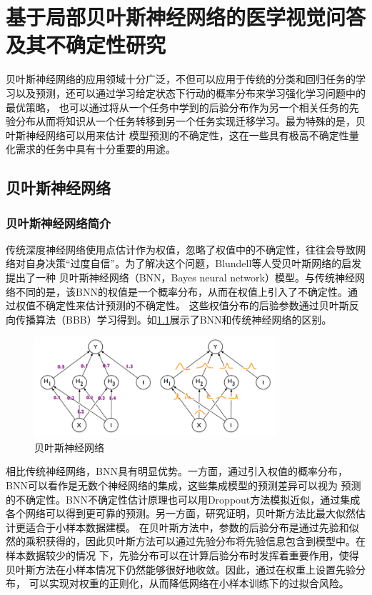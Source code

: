 \chapter{基于局部贝叶斯神经网络的医学视觉问答及其不确定性研究}
贝叶斯神经网络的应用领域十分广泛，不但可以应用于传统的分类和回归任务的学习以及预测，还可以通过学习给定状态下行动的概率分布来学习强化学习问题中的最优策略，
也可以通过将从一个任务中学到的后验分布作为另一个相关任务的先验分布从而将知识从一个任务转移到另一个任务实现迁移学习。最为特殊的是，贝叶斯神经网络可以用来估计
模型预测的不确定性，这在一些具有极高不确定性量化需求的任务中具有十分重要的用途。
%
\section{贝叶斯神经网络}
\subsection{贝叶斯神经网络简介}
传统深度神经网络使用点估计作为权值，忽略了权值中的不确定性，往往会导致网络对自身决策“过度自信”\cite{shridhar2019comprehensive}。为了解决这个问题，Blundell等人\cite{blundell2015weight}受贝叶斯网络的启发提出了一种
贝叶斯神经网络（BNN，Bayes neural network）模型。与传统神经网络不同的是，该BNN的权值是一个概率分布，从而在权值上引入了不确定性。通过权值不确定性来估计预测的不确定性。
这些权值分布的后验参数通过贝叶斯反向传播算法（BBB）学习得到。如\ref{BNN}展示了BNN和传统神经网络的区别。
\begin{figure}[htbp]
	\centering	
	\includegraphics[width=0.8\textwidth]{Fig/myfig/chapter4/BNN.png}  %
	\caption{\label{BNN}贝叶斯神经网络} 
\end{figure}

相比传统神经网络，BNN具有明显优势。一方面，通过引入权值的概率分布，BNN可以看作是无数个神经网络的集成，这些集成模型的预测差异可以视为
预测的不确定性。BNN不确定性估计原理也可以用Droppout方法模拟近似\cite{gal2016dropout}，通过集成各个网络可以得到更可靠的预测。另一方面，研究证明，贝叶斯方法比最大似然估计更适合于小样本数据建模。
在贝叶斯方法中，参数的后验分布是通过先验和似然的乘积获得的，因此贝叶斯方法可以通过先验分布将先验信息包含到模型中。在样本数据较少的情况
下，先验分布可以在计算后验分布时发挥着重要作用，使得贝叶斯方法在小样本情况下仍然能够很好地收敛\cite{mcneish2016using}。因此，通过在权重上设置先验分布，
可以实现对权重的正则化，从而降低网络在小样本训练下的过拟合风险\cite{welling2011bayesian}。

